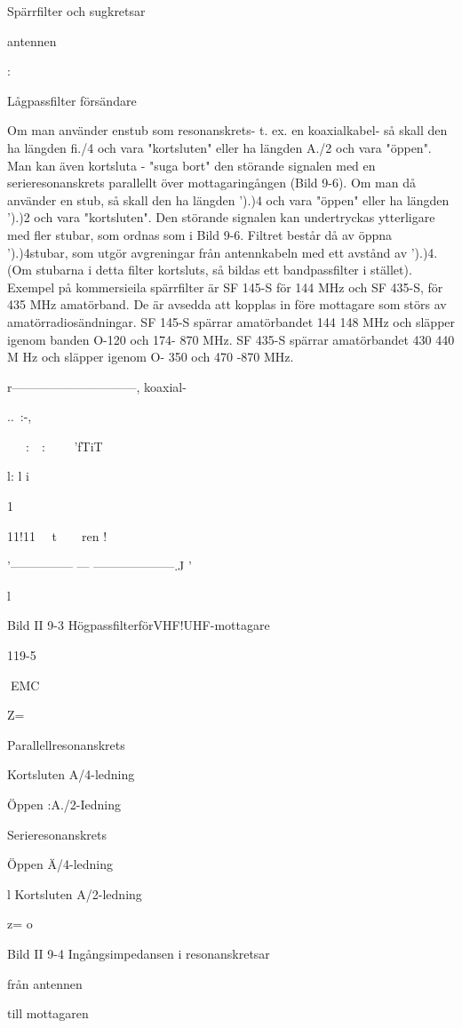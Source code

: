 Spärrfilter och sugkretsar

antennen

:

Lågpassfilter
försändare

Om man använder enstub som resonanskrets- t. ex. en koaxialkabel- så skall den ha
längden fi./4 och vara "kortsluten" eller ha
längden A./2 och vara "öppen".
Man kan även kortsluta - "suga bort" den störande signalen med en serieresonanskrets parallellt över mottagaringången
(Bild 9-6). Om man då använder en stub, så
skall den ha längden ').)4 och vara "öppen"
eller ha längden ').)2 och vara "kortsluten".
Den störande signalen kan undertryckas
ytterligare med fler stubar, som ordnas som
i Bild 9-6. Filtret består då av öppna ').)4stubar, som utgör avgreningar från antennkabeln med ett avstånd av ').)4.
(Om stubarna i detta filter kortsluts, så
bildas ett bandpassfilter i stället).
Exempel på kommersieila spärrfilter är SF
145-S för 144 MHz och SF 435-S, för 435
MHz amatörband. De är avsedda att kopplas in före mottagare som störs av amatörradiosändningar.
SF 145-S spärrar amatörbandet 144 148 MHz och släpper igenom banden O-120
och 174- 870 MHz.
SF 435-S spärrar amatörbandet 430 440 M Hz och släpper igenom O- 350 och 470
-870 MHz.

r------------------------------, koaxial-

..~:-,

~~~:~~:~ ~~~'fTiT

l: l
i

1

11!11 ~~t~~~~ren
!

'--------------- --- --------------------.J
'

l

Bild II 9-3
HögpassfilterförVHF!UHF-mottagare

119-5

EMC

Z=~

Parallellresonanskrets

Kortsluten A/4-ledning

Öppen :A./2-Iedning

Serieresonanskrets

Öppen Ä/4-ledning

l Kortsluten A/2-ledning

z= o

Bild II 9-4 Ingångsimpedansen i resonanskretsar

från
antennen

till
mottagaren

